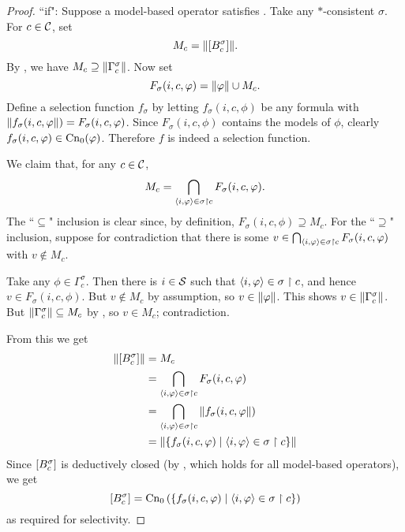 \begin{proof}
    ``if": Suppose a model-based operator satisfies \boundedness{}. Take any
    $\ast$-consistent $\sigma$. For $c \in \mathcal{C}$, set
    \[
        M_c = \|{\left[{B^\sigma_c}\right]}\|.
    \]
    By \boundedness{}, we have $M_c \supseteq \|{\Gamma^\sigma_c}\|$. Now
    set
    \[
        F_\sigma(i, c, \varphi) = \|{\varphi}\| \cup M_c.
    \]
    Define a selection function $f_\sigma$ by letting $f_\sigma(i, c, \phi)$ be
    any formula with $\|{f_\sigma(i,c, \varphi}\|) = F_\sigma(i, c, \varphi)$.
    Since $F_\sigma(i, c, \phi)$ contains the models of $\phi$, clearly
    $f_\sigma(i, c, \varphi) \in \operatorname{Cn}_0(\varphi)$. Therefore $f$ is indeed a
    selection function.

    We claim that, for any $c \in \mathcal{C}$,
    \[
        M_c
        = \bigcap_{\langle {i, \varphi} \rangle \in \sigma \upharpoonright c}{
            F_\sigma(i, c, \varphi)
        }.
    \]
    The ``$\subseteq$" inclusion is clear since, by definition, $F_\sigma(i, c,
    \phi) \supseteq M_c$. For the ``$\supseteq$" inclusion, suppose for
    contradiction that there is some $v \in \bigcap_{\langle {i, \varphi} \rangle \in \sigma
    \upharpoonright c}{F_\sigma(i, c, \varphi)}$ with $v \notin M_c$.

    Take any $\phi \in \Gamma^\sigma_c$. Then there is $i \in \mathcal{S}$ such that
    $\langle {i, \varphi} \rangle \in \sigma \upharpoonright c$, and hence $v \in F_\sigma(i, c, \phi)$.
    But $v \notin M_c$ by assumption, so $v \in \|{\varphi}\|$. This shows $v
    \in \|{\Gamma^\sigma_c}\|$. But $\|{\Gamma^\sigma_c}\| \subseteq
    M_c$ by \boundedness{}, so $v \in M_c$; contradiction.

    From this we get
    \begin{align*}
        \|{\left[{B^\sigma_c}\right]}\|
        &= M_c \\
        &= \bigcap_{\langle {i, \varphi} \rangle \in \sigma \upharpoonright c}{F_\sigma(i, c, \varphi)} \\
        &= \bigcap_{\langle {i, \varphi} \rangle \in \sigma \upharpoonright c}{
            \|{f_\sigma(i, c, \varphi}\|)
        } \\
        &= \|{\{
            f_\sigma(i, c, \varphi) \mid \langle {i, \varphi} \rangle \in \sigma \upharpoonright c
        \}}\|
    \end{align*}
    Since $\left[{B^\sigma_c}\right]$ is deductively closed (by \closure{}, which
    holds for all model-based operators), we get
    \[
        \left[{B^\sigma_c}\right]
        =
        \operatorname{Cn}_0\left(\{
            f_\sigma(i, c, \varphi) \mid \langle {i, \varphi} \rangle \in \sigma \upharpoonright c
        \}\right)
    \]
    as required for selectivity.


\end{proof}
